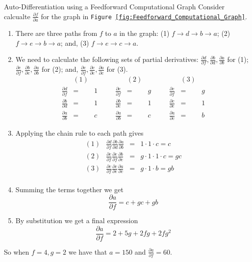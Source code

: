 \documentclass[11pt,a4paper]{article}
\begin{document}
  \begin{example}{Auto-Differentiation using a Feedforward Computational Graph}
    Consider calcualte $\frac{\partial f}{\partial a}$ for the graph in  \texttt{Figure \ref{fig:Feedforward_Computational_Graph}}.
    \begin{enumerate}
      \item There are three paths from $f$ to $a$ in the graph: (1) $f\to d\to b\to a$; (2) $f\to e\to b\to a$; and, (3) $f\to e\to c\to a$.
      \item We need to calculate the following sets of partial derivatives: $\frac{\partial d}{\partial f},\frac{\partial b}{\partial d},\frac{\partial a}{\partial b}$ for (1); $\frac{\partial e}{\partial f},\frac{\partial b}{\partial e},\frac{\partial a}{\partial b}$ for (2); and, $\frac{\partial e}{\partial f},\frac{\partial c}{\partial e},\frac{\partial a}{\partial c}$ for (3).
      \[\begin{array}{rclcrclcrcl}
        &(1)&&&&(2)&&&&(3)\\
        \frac{\partial d}{\partial f}&=&1&\quad&\frac{\partial e}{\partial f}&=&g&\quad&\frac{\partial e}{\partial f}&=&g\\
        \frac{\partial b}{\partial d}&=&1&\quad&\frac{\partial b}{\partial e}&=&1&\quad&\frac{\partial c}{\partial e}&=&1\\
        \frac{\partial a}{\partial b}&=&c&\quad&\frac{\partial a}{\partial b}&=&c&\quad&\frac{\partial a}{\partial c}&=&b
      \end{array}\]
      \item Applying the chain rule to each path gives
      \[\begin{array}{rrcl}
        (1)&\frac{\partial d}{\partial f}\frac{\partial b}{\partial d}\frac{\partial a}{\partial b}&=&1\cdot1\cdot c=c\\
        (2)&\frac{\partial e}{\partial f}\frac{\partial e}{\partial f}\frac{\partial b}{\partial e}&=&g\cdot1\cdot1\cdot c=gc\\
        (3)&\frac{\partial e}{\partial f}\frac{\partial c}{\partial e}\frac{\partial a}{\partial c}&=&g\cdot1\cdot b=gb\\
      \end{array}\]
      \item Summing the terms together we get
      \[ \frac{\partial a}{\partial f}=c+gc+gb \]
      \item By substitution we get a final expression
      \[ \frac{\partial a}{\partial f}=2+5g+2fg+2fg^2 \]
    \end{enumerate}
    So when $f=4,g=2$ we have that $a=150$ and $\frac{\partial a}{\partial f}=60$.
  \end{example}
\end{document}
